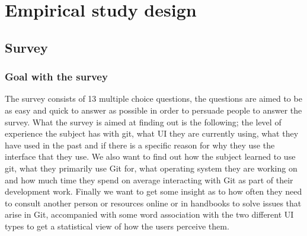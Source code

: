 \documentclass[a4paper,oneside]{bth} %
\begin{document}
			\section{Empirical study design}
			
				\subsection{Survey}
					\subsubsection*{Goal with the survey}
					The survey consists of 13 multiple choice questions, the questions are aimed to be as easy and quick to answer as possible in order to persuade people to answer the survey. What the survey is aimed at finding out is the following; the level of experience the subject has with git, what UI they are currently using, what they have used in the past and if there is a specific reason for why they use the interface that they use. We also want to find out how the subject learned to use git, what they primarily use Git for, what operating system they are working on and how much time they spend on average interacting with Git as part of their development work. Finally we want to get some insight as to how often they need to consult another person or resources online or in handbooks to solve issues that arise in Git, accompanied with some word association with the two different UI types to get a statistical view of how the users perceive them.
					
\end{document}
